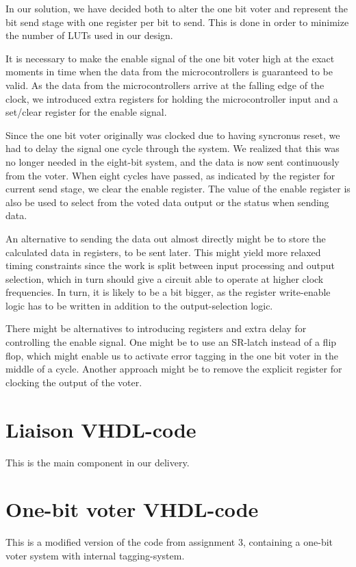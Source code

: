 \documentclass[11pt]{article}
\begin{document}
In our solution, we have decided both to alter the one bit voter and
represent the bit send stage with one register per bit to send. This
is done in order to minimize the number of LUTs used in our design. 

It is necessary to make the enable signal of the one bit voter high at
the exact moments in time when the data from the microcontrollers is
guaranteed to be valid. As the data from the microcontrollers arrive
at the falling edge of the clock, we introduced extra registers for
holding the microcontroller input and a set/clear register for the
enable signal.

Since the one bit voter originally was clocked due to having syncronus
reset, we had to delay the signal one cycle through the system. We
realized that this was no longer needed in the eight-bit system, and
the data is now sent continuously from the voter. When eight cycles
have passed, as indicated by the register for current send stage,
we clear the enable register. The value of the enable register is
also be used to select from the voted data output or the status when
sending data.

An alternative to sending the data out almost directly might be to
store the calculated data in registers, to be sent later. This might
yield more relaxed timing constraints since the work is split between
input processing and output selection, which in turn should give a
circuit able to operate at higher clock frequencies. In turn, it is
likely to be a bit bigger, as the register write-enable logic has to
be written in addition to the output-selection logic.

There might be alternatives to introducing registers and extra delay
for controlling the enable signal. One might be to use an SR-latch
instead of a flip flop, which might enable us to activate error
tagging in the one bit voter in the middle of a cycle. Another
approach might be to remove the explicit register for clocking the
output of the voter.

\appendix{}
\section{Liaison VHDL-code}
This is the main component in our delivery.

\section{One-bit voter VHDL-code}
This is a modified version of the code from assignment 3,
containing a one-bit voter system with internal tagging-system.

\end{document}

